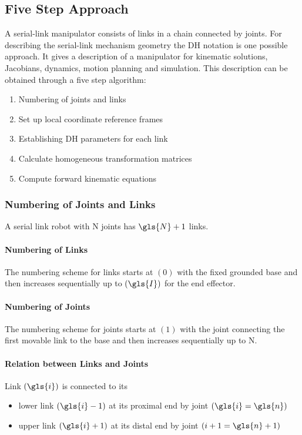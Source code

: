 \subsection{Five Step Approach}
A serial-link manipulator consists of links in a chain connected by joints. 
For describing the serial-link mechanism geometry the \acrfull{DH} notation is one possible approach.
It gives a description of a manipulator for kinematic solutions, Jacobians, dynamics, motion planning and simulation. 
This description can be obtained through a five step algorithm:\cite{ConstantinForwardKA}

\begin{enumerate}
	\item Numbering of joints and links
	\item Set up local coordinate reference frames
	\item Establishing \ac{DH} parameters for each link
	\item Calculate homogeneous transformation matrices
	\item Compute forward kinematic equations
\end{enumerate}

\subsubsection{Numbering of Joints and Links} \label{sec:NumJointLink}
A serial link robot with \gls{N} joints has $\gls{N}+1$ links. 

\paragraph{Numbering of Links}
The numbering scheme for links starts at $(0)$ with the fixed grounded base and then increases sequentially up to $(\gls{I})$ for the end effector.

\paragraph{Numbering of Joints}
The numbering scheme for joints starts at $(1)$ with the joint connecting the first movable link to the base and then increases sequentially up to \gls{N}.

\paragraph{Relation between Links and Joints}
Link $(\gls{i})$ is connected to its 
\begin{itemize}
	\item lower link $(\gls{i}-1)$ at its proximal \cite{proxdist} end by joint $(\gls{i} = \gls{n})$
	\item upper link $(\gls{i}+1)$ at its distal \cite{proxdist} end by joint $(i+1 = \gls{n}+1)$
\end{itemize}



